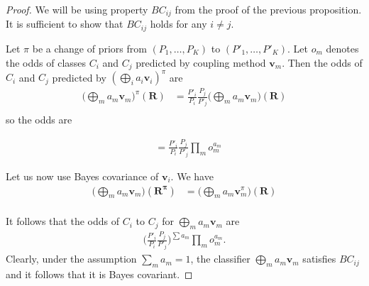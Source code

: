 \documentclass[twoside,11pt]{article}
\begin{document}
\begin{proof}
We will be using property $BC_{ij}$ from the proof of the previous proposition. It is sufficient to show that $BC_{ij}$ holds for any $i\not= j$. 

Let $\pi$ be a change of priors from $(P_1, \ldots, P_K)$  to $(P'_1, \ldots, P'_K)$. Let $o_m$ denotes the odds of classes $C_i$ and $C_j$ predicted by coupling method $\boldsymbol{v}_m$. Then the odds of $C_i$ and $C_j$ predicted by $(\bigoplus_i a_i \boldsymbol{v}_i)^\pi$ are 
\begin{align}
	\biggl(\bigoplus_m a_m \boldsymbol{v}_m\biggr)^\pi(\boldsymbol{R}) & = \frac{P'_i}{P_i} \frac{P_j}{P'_j} \biggl(\bigoplus_m a_m \boldsymbol{v}_m\biggr)(\boldsymbol{R}) \\
\end{align}
so the odds are 

\begin{align}
	&= \frac{P'_i}{P_i} \frac{P_j}{P'_j} \prod_m o_m^{a_m}
\end{align}

Let us now use Bayes covariance of $\boldsymbol{v}_i$. 
We have
\begin{align}
	\biggl(\bigoplus_m a_m \boldsymbol{v}_m\biggr)(\boldsymbol{R^\pi}) & =  \biggl(\bigoplus_m a_m \boldsymbol{v}_m^\pi\biggr)(\boldsymbol{R}) \\
\end{align}

It follows that the odds of $C_i$ to $C_j$ for $\bigoplus_m a_m \boldsymbol{v}_m$ are 
\begin{align}
\biggl(\frac{P'_i}{P_i} \frac{P_j}{P'_j} \biggr)^{\sum a_m} \prod_m o_m^{a_m}.
\end{align}
Clearly, under the assumption $\sum_m a_m = 1$, the classifier $\bigoplus_m a_m \boldsymbol{v}_m$ satisfies $BC_{ij}$ and it follows that it is Bayes covariant.
\end{proof}


% 
\end{document}

